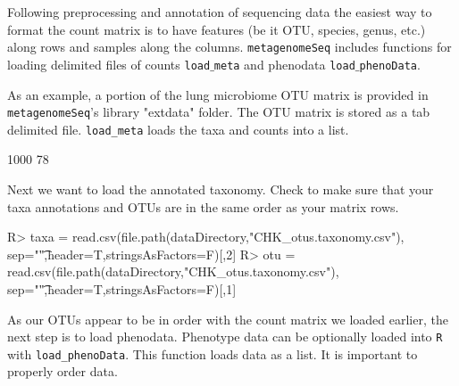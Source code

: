 \documentclass[a4paper,12pt]{article}
\begin{document}
Following preprocessing and annotation of sequencing data the easiest way to format the count matrix is to have features 
(be it OTU, species, genus, etc.) along rows and samples along the columns.
\texttt{metagenomeSeq} includes functions for loading delimited files of counts 
\texttt{load$\_$meta} and phenodata \texttt{load$\_$phenoData}.

As an example, a portion of the lung microbiome \cite{charlson} OTU matrix is provided in \texttt{metagenomeSeq}'s library "extdata" folder. 
The OTU matrix is stored as a tab delimited file.
\texttt{load\_meta} loads the taxa and counts into a list.

\begin{small}
\begin{Schunk}
\begin{Soutput}
[1] 1000   78
\end{Soutput}
\end{Schunk}
\end{small}
Next we want to load the annotated taxonomy. Check to make sure that your taxa annotations and OTUs are in the same order as your matrix rows.

\begin{small}
\begin{Schunk}
\begin{Sinput}
R> taxa = read.csv(file.path(dataDirectory,"CHK_otus.taxonomy.csv"),
                 sep="\t",header=T,stringsAsFactors=F)[,2]
R> otu  = read.csv(file.path(dataDirectory,"CHK_otus.taxonomy.csv"),
                 sep="\t",header=T,stringsAsFactors=F)[,1]
\end{Sinput}
\end{Schunk}
\end{small}

As our OTUs appear to be in order with the count matrix we loaded earlier, the next step is to load phenodata. Phenotype data can be optionally loaded into \texttt{R} with \texttt{load\_phenoData}. This function loads data as a list. It is important to properly order data.
\end{document}
